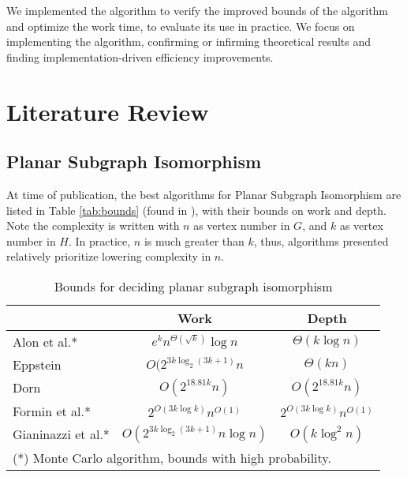 \documentclass[11pt]{article}       %
\begin{document}
We implemented the algorithm to verify the improved bounds of the algorithm and optimize the work time, to evaluate its use in practice. We focus on implementing the algorithm, confirming or infirming theoretical results and finding implementation-driven efficiency improvements.


\section{Literature Review} \label{litrev}

\subsection{Planar Subgraph Isomorphism}
At time of publication, the best algorithms for Planar Subgraph Isomorphism are listed in Table \ref{tab:bounds} (found in \cite{lukas2020}), with their bounds on work and depth. Note the complexity is written with $n$ as vertex number in $G$, and $k$ as vertex number in $H$. In practice, $n$ is much greater than $k$, thus, algorithms presented relatively prioritize lowering complexity in $n$.

\begin{table}[ht]
  \begin{center}
    \caption{Bounds for deciding planar subgraph isomorphism}
    \label{tab:table1}
    \begin{tabular}{lcc}
      & \textbf{Work} & \textbf{Depth}\\
      \hline
      Alon et al.*\cite{colorCoding} & $e^kn^{\Theta(\sqrt{k})}\log n$ & $\Theta(k \log n)$\\  
      Eppstein \cite{eppstein} & $O(2^{3k \log_2(3k+1)}n$ & $\Theta(kn)$\\
      Dorn \cite{dorn} & $O(2^{18.81k}n)$ & $O(2^{18.81k}n)$\\
      Formin et al.*\cite{fomin} & $2^{O(3k\log k)}n^{O(1)}$ & $2^{O(3k\log k)}n^{O(1)}$\\
      Gianinazzi et al.*\cite{lukas2020} & $O(2^{3k \log_2(3k+1)}n\log n)$ & $O(k \log^2n)$\\
      \hline
      \multicolumn{3}{l}{(*) Monte Carlo algorithm, bounds with high probability.}
      \label{tab:bounds}
    \end{tabular}
  \end{center}
\end{table}
\end{document}
